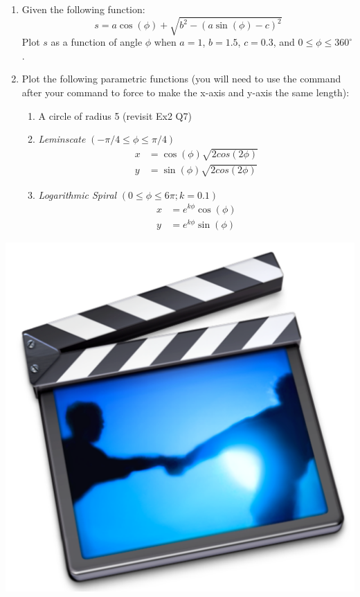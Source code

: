 {\begin{minipage}{\linewidth}
\begin{enumerate}
\item Given the following function: \\
\begin{equation*}
s=a \cos(\phi) + \sqrt{b^2 - (a \sin(\phi) - c)^2}
\end{equation*}
Plot $s$ as a function of angle $\phi$ when $a=1$, $b=1.5$, $c=0.3$, and $0 \leq \phi \leq 360^\circ$.
\item Plot the following parametric functions (you will need to use the  command after your  command to force \mlab to make the x-axis and y-axis the same length):
	\begin{enumerate}
	\item A circle of radius 5 (revisit Ex2 Q7)
	\item \textit{Leminscate} $(-\pi/4 \leq \phi \leq \pi/4)$
		\begin{align*}
		x &= \cos(\phi)\sqrt{2cos(2\phi)} \\
		y &= \sin(\phi)\sqrt{2cos(2\phi)}
		\end{align*}
	\item \textit{Logarithmic Spiral} $(0 \leq \phi \leq 6\pi; k=0.1)$
		\begin{align*}
		x &= e^{k\phi}\cos(\phi) \\
		y &= e^{k\phi}\sin(\phi)
		\end{align*}
	\end{enumerate}
\end{enumerate}
\begin{minipage}{6mm}
\includegraphics[scale=0.03]{Graphics/General/screencast_icon}

\end{minipage}
\end{minipage}}
